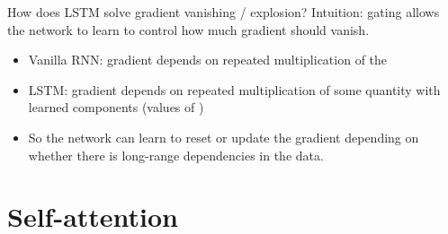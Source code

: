 \documentclass[usenames,dvipsnames,notes,11pt,aspectratio=169,hyperref={colorlinks=true, linkcolor=blue}]{beamer}
\newcommand{\pdfnote}[1]{}
\begin{document}
\begin{frame}
    {How does LSTM solve gradient vanishing / explosion?}
    Intuition: gating allows the network to learn to control how much gradient should vanish.
    \begin{itemize}
        \item Vanilla RNN: gradient depends on repeated multiplication of the 
        \item LSTM: gradient depends on repeated multiplication of some quantity with learned components (values of )
        \item So the network can learn to reset or update the gradient depending on whether there is long-range dependencies in the data.
    \end{itemize}
    \pdfnote{
        How does it fix the gradient vanishing/exploding problem?
        With RNN our problem is that we end with repeated multiplication of the same matrix.
        Try compute del c(t) over del c(t-1).
        It still involves repeated multiplication of certain quantity, but it will depend on learned values that are different at each time step, specifically the input and forget gates.
        So the network can decide when to reset the gradient or to increase the gradient signal depending on whether there is long-range dependencies in the data.
    }
\end{frame}

\section{Self-attention}
\end{document}
